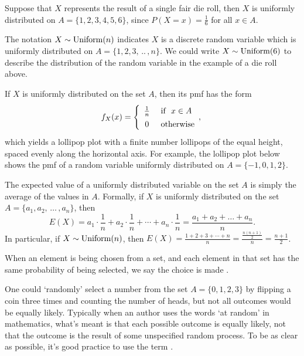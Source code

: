 \begin{example} Suppose that $X$ represents the result of a single fair die roll, then $X$ is uniformly distributed on $A = \{1,2,3,4,5,6\}$, since $P(X = x) = \frac{1}{6}$ for all $x \in A$.
\end{example}

The notation $X \sim \operatorname{Uniform}(n)$ indicates $X$ is a discrete random variable which is uniformly distributed on $A = \{1,2,3, \, .. \,, n\}$. We could write $X \sim \operatorname{Uniform}(6)$ to describe the distribution of the random variable in the example of a die roll above. 

If $X$ is uniformly distributed on the set $A$, then its pmf has the form
$$f_X(x) = \left\{
\renewcommand*{\arraystretch}{1.35}
\begin{array}{cl}
      \frac{1}{n} & \text{ if \ } x \in A \\
      0 & \text{ otherwise} \\ \end{array},
      \renewcommand*{\arraystretch}{1}
\right.$$
which yields a lollipop plot with a finite number lollipops of the equal height, spaced evenly along the horizontal axis. For example, the lollipop plot below shows the pmf of a random variable uniformly distributed on $A = \{-1,0,1,2\}$.

\begin{center}
\end{center}

The expected value of a uniformly distributed variable on the set $A$ is simply the average of the values in $A$. Formally, if $X$ is uniformly distributed on the set $A = \{a_1, a_2,\, \dots \, , a_n\}$, then
$$E(X) = a_1 \cdot \textstyle\frac{1}{n} + a_2 \cdot \frac{1}{n} + \cdots + a_n \cdot \frac{1}{n} = \frac{a_1 + a_2 + \dots + a_n}{n}.$$
In particular, if $X \sim \operatorname{Uniform}(n)$, then $E(X) = \frac{1+2+3+\cdots+n}{n} = \frac{\frac{n(n+1)}{2}}{n} = \frac{n+1}{2}$.

\begin{remark}
When an element is being chosen from a set, and each element in that set has the same probability of being selected, we say the choice is made .
 
One could `randomly' select a number from the set $A = \{0,1,2,3\}$ by flipping a coin three times and counting the number of heads, but not all outcomes would be equally likely. Typically when an author uses the words `at random' in mathematics, what's meant is that each possible outcome is equally likely, not that the outcome is the result of some unspecified random process. To be as clear as possible, it's good practice to use the term .
\end{remark}

